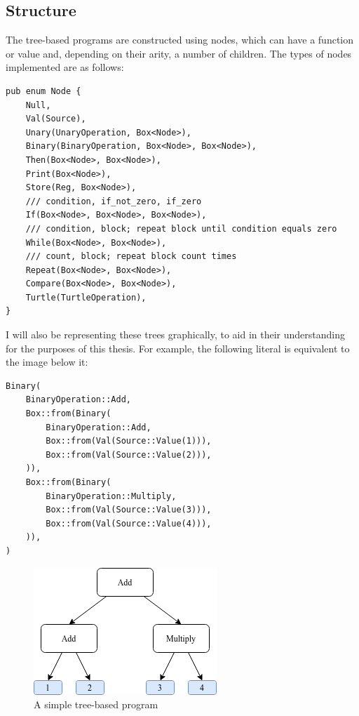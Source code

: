 \documentclass{report}
\begin{document}
\subsection{Structure}
The tree-based programs are constructed using nodes, which can have a function or value and, depending on their arity, a number of children. The types of nodes implemented are as follows:

\begin{verbatim}
pub enum Node {
    Null,
    Val(Source),
    Unary(UnaryOperation, Box<Node>),
    Binary(BinaryOperation, Box<Node>, Box<Node>),
    Then(Box<Node>, Box<Node>),
    Print(Box<Node>),
    Store(Reg, Box<Node>),
    /// condition, if_not_zero, if_zero
    If(Box<Node>, Box<Node>, Box<Node>),
    /// condition, block; repeat block until condition equals zero
    While(Box<Node>, Box<Node>),
    /// count, block; repeat block count times
    Repeat(Box<Node>, Box<Node>),
    Compare(Box<Node>, Box<Node>),
    Turtle(TurtleOperation),
}
\end{verbatim}

I will also be representing these trees graphically, to aid in their understanding for the purposes of this thesis. For example, the following literal is equivalent to the image below it:
\begin{verbatim}
Binary(
    BinaryOperation::Add,
    Box::from(Binary(
        BinaryOperation::Add,
        Box::from(Val(Source::Value(1))),
        Box::from(Val(Source::Value(2))),
    )),
    Box::from(Binary(
        BinaryOperation::Multiply,
        Box::from(Val(Source::Value(3))),
        Box::from(Val(Source::Value(4))),
    )),
)
\end{verbatim}

\begin{figure}[H]
    \centering
    \includegraphics[scale=0.75]{tree_1}
    \caption{A simple tree-based program}
\end{figure}
\end{document}
